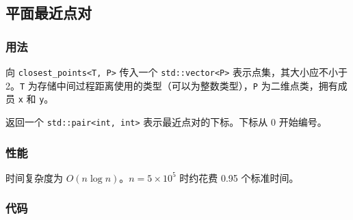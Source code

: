 \subsection{平面最近点对}

\subsubsection{用法}

向 \lstinline{closest_points<T, P>} 传入一个 \lstinline{std::vector<P>} 表示点集，其大小应不小于 2。\lstinline{T} 为存储中间过程距离使用的类型（可以为整数类型），\lstinline{P} 为二维点类，拥有成员 \lstinline{x} 和 \lstinline{y}。

返回一个 \lstinline{std::pair<int, int>} 表示最近点对的下标。下标从 0 开始编号。

\subsubsection{性能}

时间复杂度为 $O(n \log n)$。$n = 5 \times 10^5$ 时约花费 0.95 个标准时间。

\subsubsection{代码}


